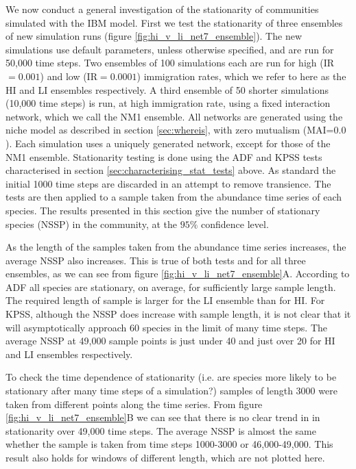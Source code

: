 We now conduct a general investigation of the stationarity of communities simulated with the IBM model. First we test the stationarity of three ensembles of new simulation runs (figure \ref{fig:hi_v_li_net7_ensemble}). The new simulations use default parameters, unless otherwise specified, and are run for 50,000 time steps. Two ensembles of 100 simulations each are run for high (IR$=0.001$) and low (IR$=0.0001$) immigration rates, which we refer to here as the HI and LI ensembles respectively. A third ensemble of 50 shorter simulations (10,000 time steps) is run, at high immigration rate, using a fixed interaction network, which we call the NM1 ensemble. All networks are generated using the niche model as described in section \ref{sec:whereis}, with zero mutualism (MAI=$0.0$). Each simulation uses a uniquely generated network, except for those of the NM1 ensemble. Stationarity testing is done using the ADF and KPSS tests characterised in section \ref{sec:characterising_stat_tests} above. As standard the initial 1000 time steps are discarded in an attempt to remove transience. The tests are then applied to a sample taken from the abundance time series of each species. The results presented in this section give the number of stationary species (NSSP) in the community, at the $95\%$ confidence level.

As the length of the samples taken from the abundance time series increases, the average NSSP also increases. This is true of both tests and for all three ensembles, as we can see from figure \ref{fig:hi_v_li_net7_ensemble}A. According to ADF all species are stationary, on average, for sufficiently large sample length. The required length of sample is larger for the LI ensemble than for HI. For KPSS, although the NSSP does increase with sample length, it is not clear that it will asymptotically approach 60 species in the limit of many time steps. The average NSSP at 49,000 sample points is just under 40 and   just over 20 for HI and LI ensembles respectively.

To check the time dependence of stationarity (i.e. are species more likely to be stationary after many time steps of a simulation?) samples of length 3000 were taken from different points along the time series. From figure \ref{fig:hi_v_li_net7_ensemble}B we can see that there is no clear trend in in stationarity over 49,000 time steps. The average NSSP is almost the same whether the sample is taken from time steps 1000-3000 or 46,000-49,000. This result also holds for windows of different length, which are not plotted here.

